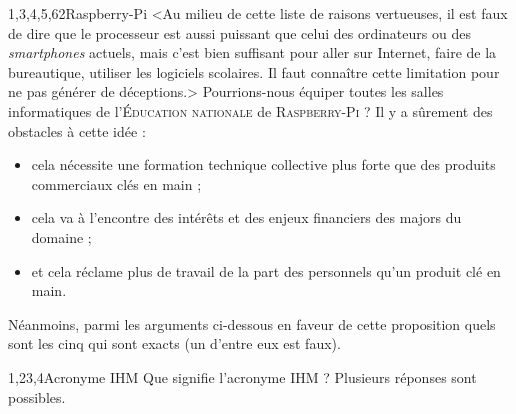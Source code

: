\begin{quiz}[title={Entrailles et contexte d'un objet numérique}]
\begin{quizquestion}[b]{1,3,4,5,6}{2}{Raspberry-Pi}
<Au milieu de cette liste de raisons vertueuses, il est faux de dire que le processeur est aussi puissant que celui des ordinateurs ou des \textit{smartphones} actuels, mais c'est bien suffisant pour aller sur Internet, faire de la bureautique, utiliser les logiciels scolaires. Il faut connaître cette limitation pour ne pas générer de déceptions.>
Pourrions-nous équiper toutes les salles informatiques de l'\textsc{Éducation nationale} de \textsc{Raspberry}\textsc{-Pi} ?
Il y a sûrement des obstacles à cette idée :
\begin{itemize}
	\item cela nécessite une formation technique collective plus forte que des produits commerciaux clés en main ;
	\item cela va à l'encontre des intérêts et des enjeux financiers des majors du domaine ;
	\item et cela réclame plus de travail de la part des personnels qu'un produit clé en main.
\end{itemize}
Néanmoins, parmi les arguments ci-dessous en faveur de cette proposition quels sont les cinq qui sont exacts (un d'entre eux est faux).
\end{quizquestion}

\begin{quizquestion}{1,2}{3,4}{Acronyme {\scshape IHM}}
Que signifie l'acronyme IHM ?
Plusieurs réponses sont possibles.
\end{quizquestion}


\end{quiz}
